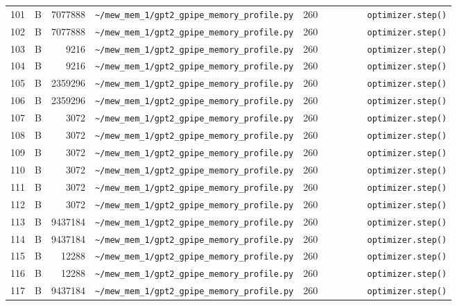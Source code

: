 \documentclass{article}
\begin{document}
\begin{longtable}{r l r p{6.5cm} r p{7.0cm}}
101 & B & 7077888 & \lstinline|~/mew_mem_1/gpt2_gpipe_memory_profile.py| & 260 & \lstinline|        optimizer.step()| \\
102 & B & 7077888 & \lstinline|~/mew_mem_1/gpt2_gpipe_memory_profile.py| & 260 & \lstinline|        optimizer.step()| \\
103 & B & 9216 & \lstinline|~/mew_mem_1/gpt2_gpipe_memory_profile.py| & 260 & \lstinline|        optimizer.step()| \\
104 & B & 9216 & \lstinline|~/mew_mem_1/gpt2_gpipe_memory_profile.py| & 260 & \lstinline|        optimizer.step()| \\
105 & B & 2359296 & \lstinline|~/mew_mem_1/gpt2_gpipe_memory_profile.py| & 260 & \lstinline|        optimizer.step()| \\
106 & B & 2359296 & \lstinline|~/mew_mem_1/gpt2_gpipe_memory_profile.py| & 260 & \lstinline|        optimizer.step()| \\
107 & B & 3072 & \lstinline|~/mew_mem_1/gpt2_gpipe_memory_profile.py| & 260 & \lstinline|        optimizer.step()| \\
108 & B & 3072 & \lstinline|~/mew_mem_1/gpt2_gpipe_memory_profile.py| & 260 & \lstinline|        optimizer.step()| \\
109 & B & 3072 & \lstinline|~/mew_mem_1/gpt2_gpipe_memory_profile.py| & 260 & \lstinline|        optimizer.step()| \\
110 & B & 3072 & \lstinline|~/mew_mem_1/gpt2_gpipe_memory_profile.py| & 260 & \lstinline|        optimizer.step()| \\
111 & B & 3072 & \lstinline|~/mew_mem_1/gpt2_gpipe_memory_profile.py| & 260 & \lstinline|        optimizer.step()| \\
112 & B & 3072 & \lstinline|~/mew_mem_1/gpt2_gpipe_memory_profile.py| & 260 & \lstinline|        optimizer.step()| \\
113 & B & 9437184 & \lstinline|~/mew_mem_1/gpt2_gpipe_memory_profile.py| & 260 & \lstinline|        optimizer.step()| \\
114 & B & 9437184 & \lstinline|~/mew_mem_1/gpt2_gpipe_memory_profile.py| & 260 & \lstinline|        optimizer.step()| \\
115 & B & 12288 & \lstinline|~/mew_mem_1/gpt2_gpipe_memory_profile.py| & 260 & \lstinline|        optimizer.step()| \\
116 & B & 12288 & \lstinline|~/mew_mem_1/gpt2_gpipe_memory_profile.py| & 260 & \lstinline|        optimizer.step()| \\
117 & B & 9437184 & \lstinline|~/mew_mem_1/gpt2_gpipe_memory_profile.py| & 260 & \lstinline|        optimizer.step()| \\

\end{longtable}
\end{document}
